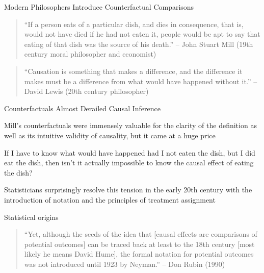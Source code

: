 \documentclass{beamer}
\begin{document}
\begin{frame}{Modern Philosophers Introduce Counterfactual Comparisons}

\begin{quote}
    ``If a person eats of a particular dish, and dies in consequence, that is, would not have died if he had not eaten it, people would be apt to say that eating of that dish was the source of his death.'' -- John Stuart Mill (19th century moral philosopher and economist)
\end{quote}

\bigskip
  
    \begin{quote}
    ``Causation is something that makes a difference, and the difference it makes must be a difference from what would have happened without it.'' -- David Lewis (20th century philosopher)
\end{quote}

\end{frame}

  
\begin{frame}{Counterfactuals Almost Derailed Causal Inference}



Mill's counterfactuals were immensely valuable for the clarity of the definition as well as its intuitive validity of causality, but it came at a huge price 

\bigskip

If I have to know what would have happened had I not eaten the dish, but I did eat the dish, then isn't it actually impossible to know the causal effect of eating the dish?

\bigskip

Statisticians surprisingly resolve this tension in the early 20th century with the introduction of notation and the principles of treatment assignment


\end{frame}


\begin{frame}{Statistical origins}

\begin{quote}
``Yet, although the seeds of the idea that [causal effects are comparisons of potential outcomes] can be traced back at least to the 18th century [most likely he means David Hume], the formal notation for potential outcomes was not introduced until 1923 by Neyman.'' -- Don Rubin (1990)
\end{quote}

\end{frame}
\end{document}
